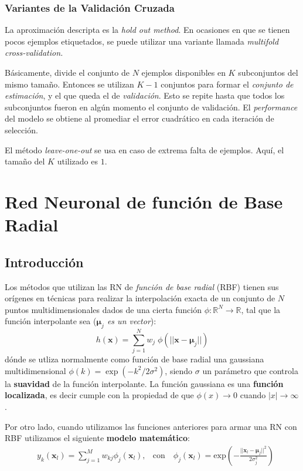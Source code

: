 \documentclass[10pt,a4paper]{article}
\begin{document}
\subsubsection{Variantes de la Validación Cruzada}

La aproximación descripta es la \textit{hold out method}. En ocasiones en que se tienen pocos ejemplos etiquetados, se puede utilizar una variante llamada \textit{multifold cross-validation.}

Básicamente, divide el conjunto de $N$ ejemplos disponibles en $K$ subconjuntos del mismo tamaño. Entonces se utilizan $K-1$ conjuntos para formar el \textit{conjunto de estimación}, y el que queda el de \textit{validación}. Esto se repite hasta que todos los subconjuntos fueron en algún momento el conjunto de validación. El \textit{performance} del modelo se obtiene al promediar el error cuadrático en cada iteración de selección.

El método \textit{leave-one-out} se usa en caso de extrema falta de ejemplos. Aquí, el tamaño del $K$ utilizado es $1$.


\section{Red Neuronal de función de Base Radial}

\subsection{Introducción}

Los métodos que utilizan las RN de \textit{función de base radial} (RBF) tienen sus orígenes en técnicas para realizar la interpolación exacta de un conjunto de $N$ puntos multidimensionales dados de una cierta función $\phi: \mathbb{R}^N \rightarrow \mathbb{R}$, tal que la función interpolante sea (\textit{$\mathbf{\mu}_j$ es un vector}):
\[
h(\mathbf{x}) = \sum_{j=1}^N w_j \; \phi(||\mathbf{x} - \mathbf{\mu}_j||)
\]
dónde se utliza normalmente como función de base radial una gaussiana multidimensional $\phi(k) = \exp(-k^2/2\sigma^2)$, siendo $\sigma$ un parámetro que controla la \textbf{suavidad} de la función interpolante. La función gaussiana es una \textbf{función localizada}, es decir cumple con la propiedad de que $\phi(x)\rightarrow 0$ cuando $|x|\rightarrow \infty$.

Por otro lado, cuando utilizamos las funciones anteriores para armar una RN con RBF utilizamos el siguiente \textbf{modelo matemático}:
\begin{align*}
&y_k (\mathbf{x}_l) = \sum_{j=1}^M w_{kj} \phi_j (\mathbf{x}_l), 
 &\text{con} \quad \phi_j (\mathbf{x}_l) = \text{exp}\left({-\frac{||\mathbf{x}_l - \mathbf{\mu}_j||^2}{2 \sigma_j^2}}\right)
\end{align*}
\end{document}
